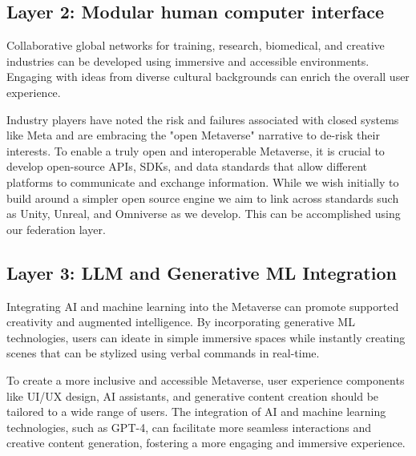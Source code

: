 \subsection{Layer 2: Modular human computer interface}
Collaborative global networks for training, research, biomedical, and creative industries can be developed using immersive and accessible environments. Engaging with ideas from diverse cultural backgrounds can enrich the overall user experience.\par
Industry players have noted the risk and failures associated with closed systems like Meta and are embracing the "open Metaverse" narrative to de-risk their interests. To enable a truly open and interoperable Metaverse, it is crucial to develop open-source APIs, SDKs, and data standards that allow different platforms to communicate and exchange information. While we wish initially to build around a simpler open source engine we aim to link across standards such as Unity, Unreal, and Omniverse as we develop. This can be accomplished using our federation layer.
\subsection{Layer 3: LLM and Generative ML Integration}
Integrating AI and machine learning into the Metaverse can promote supported creativity and augmented intelligence. By incorporating generative ML technologies, users can ideate in simple immersive spaces while instantly creating scenes that can be stylized using verbal commands in real-time.\par
To create a more inclusive and accessible Metaverse, user experience components like UI/UX design, AI assistants, and generative content creation should be tailored to a wide range of users. The integration of AI and machine learning technologies, such as GPT-4, can facilitate more seamless interactions and creative content generation, fostering a more engaging and immersive experience.
